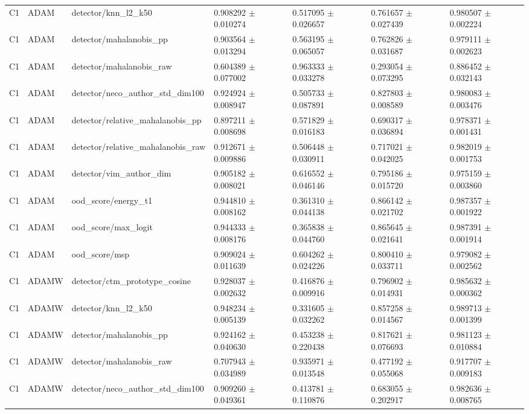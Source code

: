 \begin{longtable}{lllllll}
C1 & ADAM & detector/knn\_l2\_k50 & 0.908292 $\pm$ 0.010274 & 0.517095 $\pm$ 0.026657 & 0.761657 $\pm$ 0.027439 & 0.980507 $\pm$ 0.002224 \\
C1 & ADAM & detector/mahalanobis\_pp & 0.903564 $\pm$ 0.013294 & 0.563195 $\pm$ 0.065057 & 0.762826 $\pm$ 0.031687 & 0.979111 $\pm$ 0.002623 \\
C1 & ADAM & detector/mahalanobis\_raw & 0.604389 $\pm$ 0.077002 & 0.963333 $\pm$ 0.033278 & 0.293054 $\pm$ 0.073295 & 0.886452 $\pm$ 0.032143 \\
C1 & ADAM & detector/neco\_author\_std\_dim100 & 0.924924 $\pm$ 0.008947 & 0.505733 $\pm$ 0.087891 & 0.827803 $\pm$ 0.008589 & 0.980083 $\pm$ 0.003476 \\
C1 & ADAM & detector/relative\_mahalanobis\_pp & 0.897211 $\pm$ 0.008698 & 0.571829 $\pm$ 0.016183 & 0.690317 $\pm$ 0.036894 & 0.978371 $\pm$ 0.001431 \\
C1 & ADAM & detector/relative\_mahalanobis\_raw & 0.912671 $\pm$ 0.009886 & 0.506448 $\pm$ 0.030911 & 0.717021 $\pm$ 0.042025 & 0.982019 $\pm$ 0.001753 \\
C1 & ADAM & detector/vim\_author\_dim & 0.905182 $\pm$ 0.008021 & 0.616552 $\pm$ 0.046146 & 0.795186 $\pm$ 0.015720 & 0.975159 $\pm$ 0.003860 \\
C1 & ADAM & ood\_score/energy\_t1 & 0.944810 $\pm$ 0.008162 & 0.361310 $\pm$ 0.044138 & 0.866142 $\pm$ 0.021702 & 0.987357 $\pm$ 0.001922 \\
C1 & ADAM & ood\_score/max\_logit & 0.944333 $\pm$ 0.008176 & 0.365838 $\pm$ 0.044760 & 0.865645 $\pm$ 0.021641 & 0.987391 $\pm$ 0.001914 \\
C1 & ADAM & ood\_score/msp & 0.909024 $\pm$ 0.011639 & 0.604262 $\pm$ 0.024226 & 0.800410 $\pm$ 0.033711 & 0.979082 $\pm$ 0.002562 \\
C1 & ADAMW & detector/ctm\_prototype\_cosine & 0.928037 $\pm$ 0.002632 & 0.416876 $\pm$ 0.009916 & 0.796902 $\pm$ 0.014931 & 0.985632 $\pm$ 0.000362 \\
C1 & ADAMW & detector/knn\_l2\_k50 & 0.948234 $\pm$ 0.005139 & 0.331605 $\pm$ 0.032262 & 0.857258 $\pm$ 0.014567 & 0.989713 $\pm$ 0.001399 \\
C1 & ADAMW & detector/mahalanobis\_pp & 0.924162 $\pm$ 0.040630 & 0.453238 $\pm$ 0.220438 & 0.817621 $\pm$ 0.076693 & 0.981123 $\pm$ 0.010884 \\
C1 & ADAMW & detector/mahalanobis\_raw & 0.707943 $\pm$ 0.034989 & 0.935971 $\pm$ 0.013548 & 0.477192 $\pm$ 0.055068 & 0.917707 $\pm$ 0.009183 \\
C1 & ADAMW & detector/neco\_author\_std\_dim100 & 0.909260 $\pm$ 0.049361 & 0.413781 $\pm$ 0.110876 & 0.683055 $\pm$ 0.202917 & 0.982636 $\pm$ 0.008765 \\

\end{longtable}

